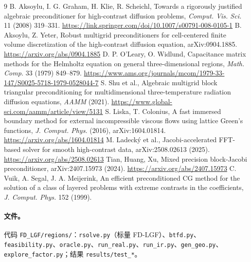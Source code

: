 \documentclass[11pt,a4paper]{ctexart}
\begin{document}
\begin{thebibliography}{9}
 B. Aksoylu, I. G. Graham, H. Klie, R. Scheichl, Towards a rigorously justified algebraic preconditioner for high-contrast diffusion problems, \emph{Comput. Vis. Sci.} 11 (2008) 319--331. \url{https://link.springer.com/doi/10.1007/s00791-008-0105-1}
 B. Aksoylu, Z. Yeter, Robust multigrid preconditioners for cell-centered finite volume discretization of the high-contrast diffusion equation, arXiv:0904.1885. \url{https://arxiv.org/abs/0904.1885}
 D. P. O'Leary, O. Widlund, Capacitance matrix methods for the Helmholtz equation on general three-dimensional regions, \emph{Math. Comp.} 33 (1979) 849--879. \url{https://www.ams.org/journals/mcom/1979-33-147/S0025-5718-1979-0528044-7}
 S. Shu et al., Algebraic multigrid block triangular preconditioning for multidimensional three-temperature radiation diffusion equations, \emph{AAMM} (2021). \url{https://www.global-sci.com/aamm/article/view/5131}
 S. Liska, T. Colonius, A fast immersed boundary method for external incompressible viscous flows using lattice Green's functions, \emph{J. Comput. Phys.} (2016), arXiv:1604.01814. \url{https://arxiv.org/abs/1604.01814}
 M. Ladecký et al., Jacobi-accelerated FFT-based solver for smooth high-contrast data, arXiv:2508.02613 (2025). \url{https://arxiv.org/abs/2508.02613}
 Tian, Huang, Xu, Mixed precision block-Jacobi preconditioner, arXiv:2407.15973 (2024). \url{https://arxiv.org/abs/2407.15973}
 C. Vuik, A. Segal, J. A. Meijerink, An efficient preconditioned CG method for the solution of a class of layered problems with extreme contrasts in the coefficients, \emph{J. Comput. Phys.} 152 (1999).
\end{thebibliography}

\paragraph{文件。}\sloppy 代码 \texttt{FD\_LGF/regions/}：\texttt{rsolve.py}（标量 FD-LGF）、\texttt{btfd.py}、\texttt{feasibility.py}、\texttt{oracle.py}、\texttt{run\_real.py}、\texttt{run\_ir.py}、\texttt{gen\_geo.py}、\texttt{explore\_factor.py}；结果 \texttt{results/test\_*}。
\end{document}
